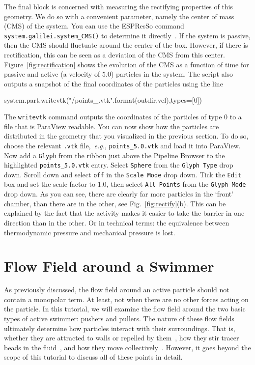 \documentclass[aip,jcp,reprint,a4paper,onecolumn,amsmath]{revtex4-1}
\newcommand\code{\lstinline}
\newcommand{\es}{\mbox{\textsf{ESPResSo}}\xspace}
\newcommand\codees{\lstinline[language=python]}
\begin{document}
The final block is concerned with measuring the rectifying properties of this
geometry. We do so with a convenient parameter, namely the center of mass (CMS)
of the system. You can use the \es{} command
\codees{system.galilei.system_CMS()} to determine it directly~\cite{UG}. If the
system is passive, then the CMS should fluctuate around the center of the box.
However, if there is rectification, this can be seen as a deviation of the CMS
from this center. Figure~\ref{fig:rectification} shows the evolution of the CMS
as a function of time for passive and active (a velocity of 5.0) particles in
the system. The script also outputs a snapshot of the final coordinates of the
particles using the line
\begin{espresso}
system.part.writevtk("{}/points_{}.vtk".format(outdir,vel),types=[0])
\end{espresso}
The \codees{writevtk} command outputs the coordinates of the particles of type
0 to a file that is ParaView readable. You can now show how the particles are
distributed in the geometry that you visualized in the previous section. To do
so, choose the relevant \code{.vtk} file,~\textit{e.g.}, \code{points_5.0.vtk}
and load it into ParaView. Now add a \code{Glyph} from the ribbon just above
the Pipeline Browser to the highlighted \code{points_5.0.vtk} entry. Select
\code{Sphere} from the \code{Glyph Type} drop down. Scroll down and select
\code{off} in the \code{Scale Mode} drop down. Tick the \code{Edit} box and set
the scale factor to 1.0, then select \code{All Points} from the
\code{Glyph Mode} drop down. As you can see, there are clearly far more
particles in the `front' chamber, than there are in the other, see
Fig.~\ref{fig:rectify}(b). This can be explained by the fact that the activity
makes it easier to take the barrier in one direction than in the other. Or in
technical terms: the equivalence between thermodynamic pressure and mechanical
pressure is lost.

\section{\label{sec:flow}Flow Field around a Swimmer}

As previously discussed, the flow field around an active particle should not
contain a monopolar term. At least, not when there are no other forces acting
on the particle. In this tutorial, we will examine the flow field around the
two basic types of active swimmer: pushers and pullers. The nature of these
flow fields ultimately determine how particles interact with their
surroundings. That is, whether they are attracted to walls or repelled by
them~\cite{Spagnolie_12}, how they stir tracer beads in the
fluid~\cite{Morozov_14}, and how they move collectively~\cite{Zoettl_14}.
However, it goes beyond the scope of this tutorial to discuss all of these
points in detail.
\end{document}
